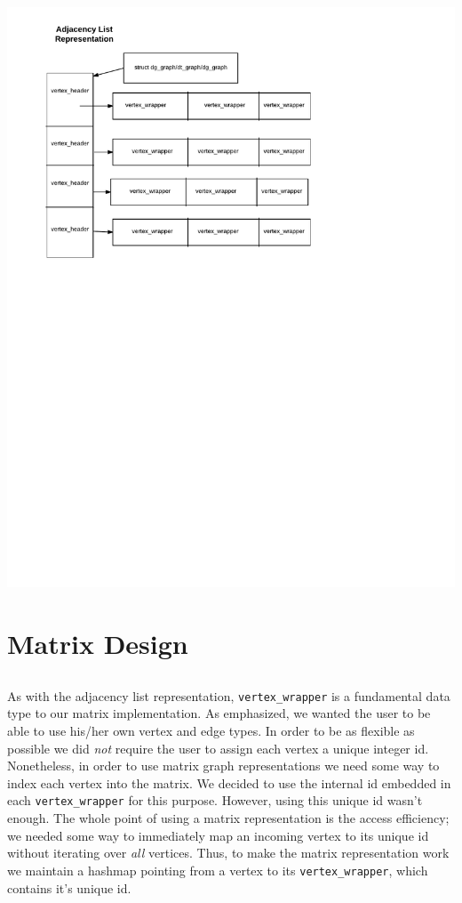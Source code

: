 \documentclass{article}
\begin{document}
\includegraphics{al}

\section{Matrix Design}
\subsection{}
As with the adjacency list representation, \texttt{vertex\_wrapper} is a fundamental data type to our matrix implementation. As emphasized, we wanted the user to be able to use his/her own vertex and edge types. In order to be as flexible as possible we did \emph{not} require the user to assign each vertex a unique integer id. Nonetheless, in order to use matrix graph representations we need some way to index each vertex into the matrix. We decided to use the internal id embedded in each \texttt{vertex\_wrapper} for this purpose. However, using this unique id wasn't enough. The whole point of using a matrix representation is the access efficiency; we needed some way to immediately map an incoming vertex to its unique id without iterating over \emph{all} vertices. Thus, to make the matrix representation work we maintain a hashmap pointing from a vertex to its \texttt{vertex\_wrapper}, which contains it's unique id. 
\end{document}

